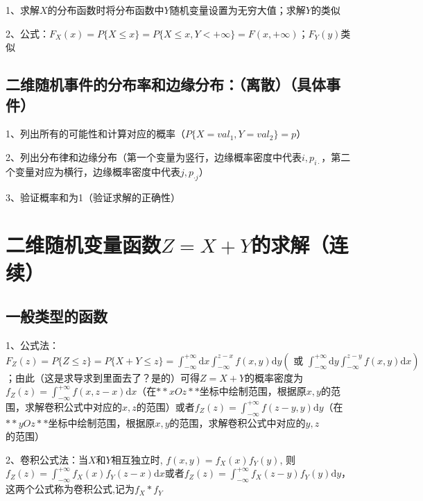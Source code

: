 1、求解$ X $的分布函数时将分布函数中$ Y $随机变量设置为无穷大值；求解$ Y $的类似

2、公式：$ F_X(x)=P\{X \le x\} = P\{X \le x,Y<+\infty\} = F(x, +\infty) $；$ F_Y(y) $类似



\subsection{二维随机事件的分布率和边缘分布：（离散）（具体事件）}

1、列出所有的可能性和计算对应的概率（$ P\{X=val_1,Y=val_2\} = p $）

2、列出分布律和边缘分布（第一个变量为竖行，边缘概率密度中代表$ i,p_{i\cdot} $，第二个变量对应为横行，边缘概率密度中代表$ j,p_{\cdot j} $）

3、验证概率和为1（验证求解的正确性）

\section{二维随机变量函数$ Z=X+Y $的求解（连续）}



\subsection{一般类型的函数}

1、公式法：$ F_{Z}(z)=P\{Z \leqslant z\}=P\{X+Y \leqslant z\}=\int_{-\infty}^{+\infty} \mathrm{d} x \int_{-\infty}^{z-x} f(x, y) \mathrm{d} y\left(\text { 或 } \int_{-\infty}^{+\infty} \mathrm{d} y \int_{-\infty}^{z-y} f(x, y) \mathrm{d} x\right) $；由此（这是求导求到里面去了？是的）可得$ Z=X+Y $的概率密度为$ f_{Z}(z)=\int_{-\infty}^{+\infty} f(x, z-x) \mathrm{d} x $（在$ **xOz** $坐标中绘制范围，根据原$ x,y $的范围，求解卷积公式中对应的$ x,z $的范围）或者$ f_{Z}(z)=\int_{-\infty}^{+\infty} f(z-y, y) \mathrm{d} y $（在$ **yOz** $坐标中绘制范围，根据原$ x,y $的范围，求解卷积公式中对应的$ y,z $的范围）

2、卷积公式法：当$ X $和$ Y $相互独立时, $ f(x, y)=f_{X}(x) f_{Y}(y) $, 则$ f_{Z}(z)=\int_{-\infty}^{+\infty} f_{X}(x) f_{Y}(z-x) \mathrm{d} x $或者$ f_{Z}(z)=\int_{-\infty}^{+\infty} f_{X}(z-y) f_{Y}(y) \mathrm{d} y $，这两个公式称为卷积公式,记为$ f_{X} * f_{Y} $

